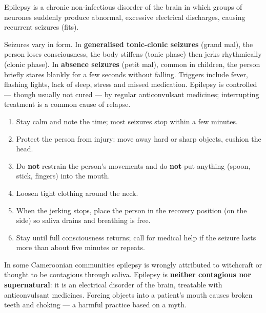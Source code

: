 \documentclass[11pt]{article}
\newcommand{\cle}[1]{{\popxbold\color{popdark}#1}}
\newcounter{popsec}
\newcounter{popsub}
\newcommand{\courssub}[1]{%
  \stepcounter{popsub}%
  \par\vspace{9pt}\noindent{\popxbold\fontsize{11.5}{13}\selectfont\color{popink}{\color{poporange}\thepopsec.\thepopsub}\hspace{6pt}#1}\par\nopagebreak\vspace{4pt}
}
\begin{document}
\courssub{Epilepsy}

\begin{definition}[Epilepsy]
\cle{Epilepsy} is a chronic non-infectious disorder of the brain in which groups of neurones suddenly produce \cle{abnormal, excessive electrical discharges}, causing recurrent \cle{seizures} (fits).
\end{definition}

Seizures vary in form. In \textbf{generalised tonic-clonic seizures} (grand mal), the person loses consciousness, the body stiffens (tonic phase) then jerks rhythmically (clonic phase). In \textbf{absence seizures} (petit mal), common in children, the person briefly stares blankly for a few seconds without falling. Triggers include fever, flashing lights, lack of sleep, stress and missed medication. Epilepsy is controlled — though usually not cured — by regular \cle{anticonvulsant} medicines; interrupting treatment is a common cause of relapse.

\begin{methode}
\begin{enumerate}
\item Stay calm and note the time; most seizures stop within a few minutes.
\item Protect the person from injury: move away hard or sharp objects, cushion the head.
\item Do \textbf{not} restrain the person's movements and do \textbf{not} put anything (spoon, stick, fingers) into the mouth.
\item Loosen tight clothing around the neck.
\item When the jerking stops, place the person in the \cle{recovery position} (on the side) so saliva drains and breathing is free.
\item Stay until full consciousness returns; call for medical help if the seizure lasts more than about five minutes or repeats.
\end{enumerate}
\end{methode}

\begin{attention}
In some Cameroonian communities epilepsy is wrongly attributed to witchcraft or thought to be contagious through saliva. Epilepsy is \textbf{neither contagious nor supernatural}: it is an electrical disorder of the brain, treatable with anticonvulsant medicines. Forcing objects into a patient's mouth causes broken teeth and choking — a harmful practice based on a myth.
\end{attention}
\end{document}
